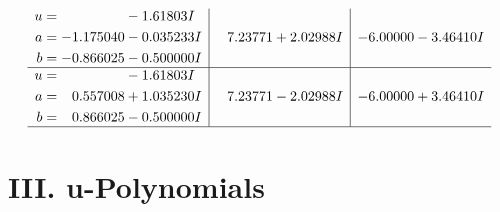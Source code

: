 \documentclass[1p]{elsarticle_modified}
\theoremstyle{definition}
\begin{document}
$$\begin{array}{c|c|c}
\begin{aligned}
u &= \phantom{-0.000000 } -1.61803 I \\
a &= -1.175040 - 0.035233 I \\
b &= -0.866025 - 0.500000 I\end{aligned}
 & \phantom{-}7.23771 + 2.02988 I & -6.00000 - 3.46410 I \\ \hline\begin{aligned}
u &= \phantom{-0.000000 } -1.61803 I \\
a &= \phantom{-}0.557008 + 1.035230 I \\
b &= \phantom{-}0.866025 - 0.500000 I\end{aligned}
 & \phantom{-}7.23771 - 2.02988 I & -6.00000 + 3.46410 I\\
 \hline 
 \end{array}$$\newpage
\newpage\renewcommand{\arraystretch}{1}
\centering \section*{ III. u-Polynomials}
\end{document}
